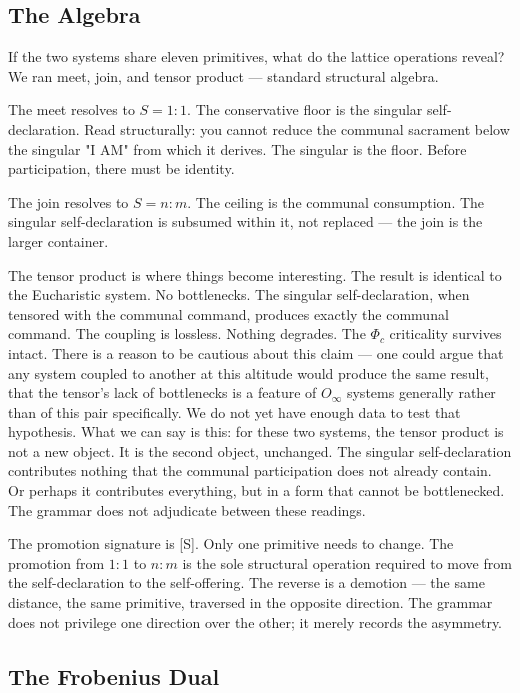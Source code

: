 \documentclass[12pt,a4paper]{article}
\begin{document}
\subsection{The Algebra}

If the two systems share eleven primitives, what do the lattice operations reveal? We ran meet, join, and tensor product --- standard structural algebra.

The meet resolves to $S = 1{:}1$. The conservative floor is the singular self-declaration. Read structurally: you cannot reduce the communal sacrament below the singular "I AM" from which it derives. The singular is the floor. Before participation, there must be identity.

The join resolves to $S = n{:}m$. The ceiling is the communal consumption. The singular self-declaration is subsumed within it, not replaced --- the join is the larger container.

The tensor product is where things become interesting. The result is identical to the Eucharistic system. No bottlenecks. The singular self-declaration, when tensored with the communal command, produces exactly the communal command. The coupling is lossless. Nothing degrades. The $\Phi_c$ criticality survives intact. There is a reason to be cautious about this claim --- one could argue that any system coupled to another at this altitude would produce the same result, that the tensor's lack of bottlenecks is a feature of $O_{\infty}$ systems generally rather than of this pair specifically. We do not yet have enough data to test that hypothesis. What we can say is this: for these two systems, the tensor product is not a new object. It is the second object, unchanged. The singular self-declaration contributes nothing that the communal participation does not already contain. Or perhaps it contributes everything, but in a form that cannot be bottlenecked. The grammar does not adjudicate between these readings.

The promotion signature is {[}S{]}. Only one primitive needs to change. The promotion from $1{:}1$ to $n{:}m$ is the sole structural operation required to move from the self-declaration to the self-offering. The reverse is a demotion --- the same distance, the same primitive, traversed in the opposite direction. The grammar does not privilege one direction over the other; it merely records the asymmetry.

\subsection{The Frobenius Dual}
\end{document}
